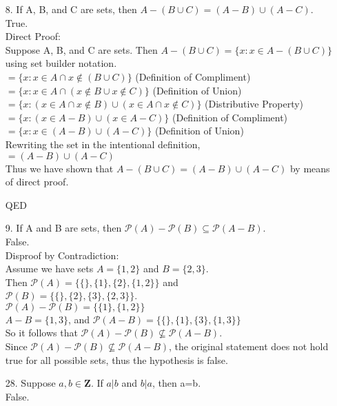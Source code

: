 \documentclass[10pt] {report}
\begin{document}
\begin{enumerate}
\item[8.] If A, B, and C are sets, then $A-(B \cup C)=(A-B)\cup(A-C).$\\
True.\\
Direct Proof:\\
Suppose A, B, and C are sets. Then $A-(B \cup C)=\{x:x\in A-(B \cup C)\}$ using set builder notation.\\
    $=\{x:x \in A \cap x \notin (B \cup C)\}$ \hfill (Definition of Compliment)\\
    $=\{x:x \in A \cap (x\notin B \cup x\notin C)\}$ \hfill (Definition of Union)\\
    $=\{x:(x \in A \cap x\notin B) \cup (x \in A \cap x \notin C)\}$ \hfill (Distributive Property)\\
    $=\{x:(x \in A-B) \cup (x\in A-C)\}$ \hfill (Definition of Compliment)\\
    $=\{x:x \in (A-B) \cup (A-C)\}$ \hfill (Definition of Union)\\
Rewriting the set in the intentional definition,\\
$=(A-B) \cup (A-C)$\\
Thus we have shown that $A-(B \cup C)=(A-B) \cup (A-C)$ by means of direct proof.
\begin{flushright} QED \end{flushright}
\item[9.] If A and B are sets, then $\mathcal{P}(A)-\mathcal{P}(B)\subseteq\mathcal{P}(A-B)$.\\
False.\\
Disproof by Contradiction:\\
Assume we have sets $A=\{1,2\}$ and $B=\{2,3\}$.\\
Then $\mathcal{P}(A)=\{\{\},\{1\},\{2\},\{1,2\}\}$ and\\
$\mathcal{P}(B)=\{\{\},\{2\},\{3\},\{2,3\}\}$.\\
$\mathcal{P}(A)-\mathcal{P}(B)=\{\{1\},\{1,2\}\}$\\
$A-B=\{1,3\}$, and $\mathcal{P}(A-B)=\{\{\},\{1\},\{3\},\{1,3\}\}$\\
So it follows that $\mathcal{P}(A)-\mathcal{P}(B) \nsubseteq \mathcal{P}(A-B)$.\\
Since $\mathcal{P}(A)-\mathcal{P}(B) \nsubseteq \mathcal{P}(A-B)$, the original statement does not hold true for all possible sets, thus the hypothesis is false.
\item[28.] Suppose $a,b\in\mathbf{Z}$. If $a|b$ and $b|a$, then a=b.\\
False.\\

\end{enumerate}
\end{document}
